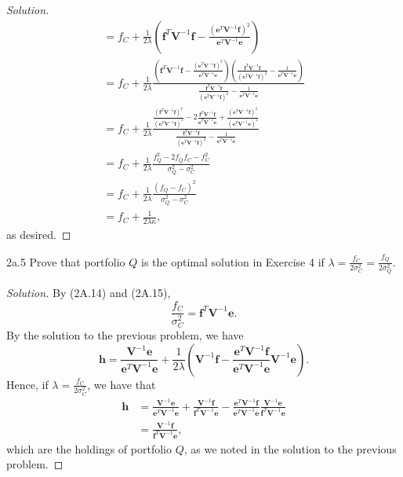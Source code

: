 \begin{proof}[Solution]
\begin{align*}
&= f_{C} + \frac{1}{2\lambda}\left(\mathbf{f}^{T}\mathbf{V}^{-1}\mathbf{f} - \frac{(\mathbf{e}^{T}\mathbf{V}^{-1}\mathbf{f})^{2}}{\mathbf{e}^{T}\mathbf{V}^{-1}\mathbf{e}}\right) & \\
&= f_{C} + \frac{1}{2\lambda}\frac{\left(\mathbf{f}^{T}\mathbf{V}^{-1}\mathbf{f} - \frac{(\mathbf{e}^{T}\mathbf{V}^{-1}\mathbf{f})^{2}}{\mathbf{e}^{T}\mathbf{V}^{-1}\mathbf{e}}\right)\left(\frac{\mathbf{f}^{T}\mathbf{V}^{-1}\mathbf{f}}{(\mathbf{e}^{T}\mathbf{V}^{-1}\mathbf{f})^{2}} - \frac{1}{\mathbf{e}^{T}\mathbf{V}^{-1}\mathbf{e}}\right)}{\frac{\mathbf{f}^{T}\mathbf{V}^{-1}\mathbf{f}}{(\mathbf{e}^{T}\mathbf{V}^{-1}\mathbf{f})^{2}} - \frac{1}{\mathbf{e}^{T}\mathbf{V}^{-1}\mathbf{e}}} &  \\
&= f_{C} + \frac{1}{2\lambda}\frac{\frac{(\mathbf{f}^{T}\mathbf{V}^{-1}\mathbf{f})^{2}}{(\mathbf{e}^{T}\mathbf{V}^{-1}\mathbf{f})^{2}} - 2\frac{\mathbf{f}^{T}\mathbf{V}^{-1}\mathbf{f}}{\mathbf{e}^{T}\mathbf{V}^{-1}\mathbf{e}} + \frac{(\mathbf{e}^{T}\mathbf{V}^{-1}\mathbf{f})^{2}}{(\mathbf{e}^{T}\mathbf{V}^{-1}\mathbf{e})^{2}}}{\frac{\mathbf{f}^{T}\mathbf{V}^{-1}\mathbf{f}}{(\mathbf{e}^{T}\mathbf{V}^{-1}\mathbf{f})^{2}} - \frac{1}{\mathbf{e}^{T}\mathbf{V}^{-1}\mathbf{e}}} & \\
&= f_{C} + \frac{1}{2\lambda}\frac{f_{Q}^{2} - 2f_{Q}f_{C} - f_{C}^{2}}{\sigma_{Q}^{2} - \sigma_{C}^{2}} & \\
&= f_{C} + \frac{1}{2\lambda}\frac{(f_{Q} - f_{C})^{2}}{\sigma_{Q}^{2} - \sigma_{C}^{2}} &\\
&= f_{C} + \frac{1}{2\lambda\kappa}, & 
\end{align*}
as desired.
\end{proof}

\begin{problem}{2a.5}
Prove that portfolio $Q$ is the optimal solution in Exercise 4 if $\lambda = \frac{f_{C}}{2\sigma_{C}^{2}} = \frac{f_{Q}}{2\sigma_{Q}^{2}}$.
\end{problem}

\begin{proof}[Solution]
By (2A.14) and (2A.15), \[\frac{f_{C}}{\sigma_{C}^{2}} = \mathbf{f}^{T}\mathbf{V}^{-1}\mathbf{e}.\] By the solution to the previous problem, we have \[\mathbf{h} = \frac{\mathbf{V}^{-1}\mathbf{e}}{\mathbf{e}^{T}\mathbf{V}^{-1}\mathbf{e}} + \frac{1}{2\lambda}\left(\mathbf{V}^{-1}\mathbf{f} - \frac{\mathbf{e}^{T}\mathbf{V}^{-1}\mathbf{f}}{\mathbf{e}^{T}\mathbf{V}^{-1}\mathbf{e}}\mathbf{V}^{-1}\mathbf{e}\right).\] Hence, if $\lambda =  \frac{f_{C}}{2\sigma_{C}^{2}}$, we have that
\begin{align*}
\mathbf{h} &= \frac{\mathbf{V}^{-1}\mathbf{e}}{\mathbf{e}^{T}\mathbf{V}^{-1}\mathbf{e}} + \frac{\mathbf{V}^{-1}\mathbf{f}}{\mathbf{f}^{T}\mathbf{V}^{-1}\mathbf{e}} - \frac{\mathbf{e}^{T}\mathbf{V}^{-1}\mathbf{f}}{\mathbf{e}^{T}\mathbf{V}^{-1}\mathbf{e}}\frac{\mathbf{V}^{-1}\mathbf{e}}{\mathbf{f}^{T}\mathbf{V}^{-1}\mathbf{e}} \\
&= \frac{\mathbf{V}^{-1}\mathbf{f}}{\mathbf{f}^{T}\mathbf{V}^{-1}\mathbf{e}},
\end{align*}
which are the holdings of portfolio $Q$, as we noted in the solution to the previous problem.
\end{proof}


